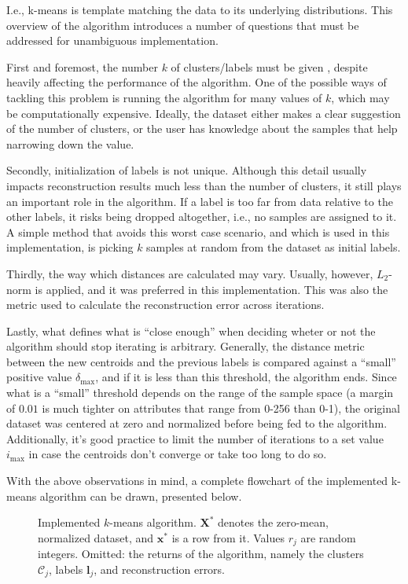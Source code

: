 I.e., k-means is template matching the data to its underlying distributions.
This overview of the algorithm introduces a number of questions that must be addressed for 
unambiguous implementation.  

First and foremost, the number $k$ of clusters/labels must be given , 
despite heavily affecting the performance of the algorithm.
%
One of the possible ways of tackling this problem is 
running the algorithm for many values of $k$, which may be computationally expensive.
%
Ideally, the dataset either makes a clear suggestion of the number of clusters,
or the user has knowledge about the samples that help narrowing down the value.

Secondly, initialization of labels is not unique.
%
Although this detail usually impacts reconstruction results much less than the number of clusters,
it still plays an important role in the algorithm.
%
If a label is too far from data relative to the other labels, it risks being dropped altogether, i.e.,
no samples are assigned to it.
%
A simple method that avoids this worst case scenario, and which is used in this implementation,
is picking $k$ samples at random from the dataset as initial labels.

Thirdly, the way which distances are calculated may vary.
Usually, however, $L_2$-norm is applied, and it was preferred in this implementation.
This was also the metric used to calculate the reconstruction error across iterations.

Lastly, what defines what is ``close enough'' when deciding wheter or not 
the algorithm should stop iterating  is arbitrary.
%
Generally, the distance metric between the new centroids and the previous labels 
is compared against a ``small'' positive value $\delta_{\max}$, and if it is less than this threshold,
the algorithm ends.
%
Since what is a ``small'' threshold depends on the range of the sample space 
(a margin of $0.01$ is much tighter on attributes that range from 0-256 than 0-1),
the original dataset was centered at zero and normalized before being fed to the algorithm.
%
Additionally, it's good practice to limit the number of iterations to a set value $i_{\max}$ 
in case the centroids don't converge or take too long to do so.

With the above observations in mind, a complete flowchart of the implemented k-means algorithm
can be drawn, presented below.
%
\begin{figure}[htbp]
    \centering
    \caption{
        Implemented $k$-means algorithm.
        $\mathbf{X}^*$ denotes the zero-mean, normalized dataset,
        and $\mathbf{x}^*$ is a row from it.
        Values $r_j$ are random integers.
        Omitted: the returns of the algorithm, 
        namely the clusters $\mathcal{C}_j$, 
        labels $\mathbf{l}_j$,
        and reconstruction errors.
    }
    \label{fig:kmeans-flowchart}
    
\end{figure}

